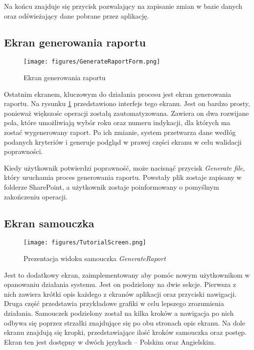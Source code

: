  Na końcu znajduje się przycisk pozwalający na zapisanie zmian w bazie danych oraz odświeżający dane pobrane przez aplikację.

 \subsection{Ekran generowania raportu}

 \begin{figure}[H]
     \centering
     \texttt{[image: figures/GenerateRaportForm.png]}
     \caption{Ekran generowania raportu}
     \label{fig:generateraportform}
 \end{figure}

 Ostatnim ekranem, kluczowym do działania procesu jest ekran generowania raportu. Na rysunku \ref{fig:generateraportform} przedstawiono interfejs tego ekranu. Jest on bardzo prosty, ponieważ większośc operacji zostałą zautomatyzowana. Zawiera on dwa rozwijane pola, które umożliwiają wybór roku oraz numeru indykacji, dla których ma zostać wygenerowany raport. Po ich zmianie, system przetwarza dane wedłóg podanych kryteriów i generuje podgląd w prawej części ekranu w celu walidacji poprawności.

 Kiedy użytkownik potwierdzi poprawność, może nacisnąć przycisk \emph{Generate file}, który uruchamia proces generowania raportu. Powstały plik zostaje zapisany w folderze SharePoint, a użytkownik zostaje poinformowany o pomyślnym zakończeniu operacji.

 \subsection{Ekran samouczka}

 \begin{figure}[H]
    \centering
    \texttt{[image: figures/TutorialScreen.png]}
    \caption{Prezentacja widoku samouczka \emph{GenerateRaport}}
    \label{fig:tutorial}
\end{figure}

Jest to dodatkowy ekran, zaimplementowany aby pomóc nowym użytkownikom w opanowaniu działania systemu. Jest on podzielony na dwie sekcje. Pierwsza z nich zawiera krótki opis każdego z ekranów aplikacji oraz przyciski nawigacji. Druga część przedstawia przykładowe grafiki w celu lepszego zrozumienia działania. Samouczek podzielony został na kilka kroków a nawigacja po nich odbywa się poprzez strzałki znajdujące się po obu stronach opis ekranu. Na dole ekranu znajdują się kropki, przedstawiające ilość kroków samouczka oraz postęp. Ekran ten jest dostępny w dwóch językach -- Polskim oraz Angielskim. 
